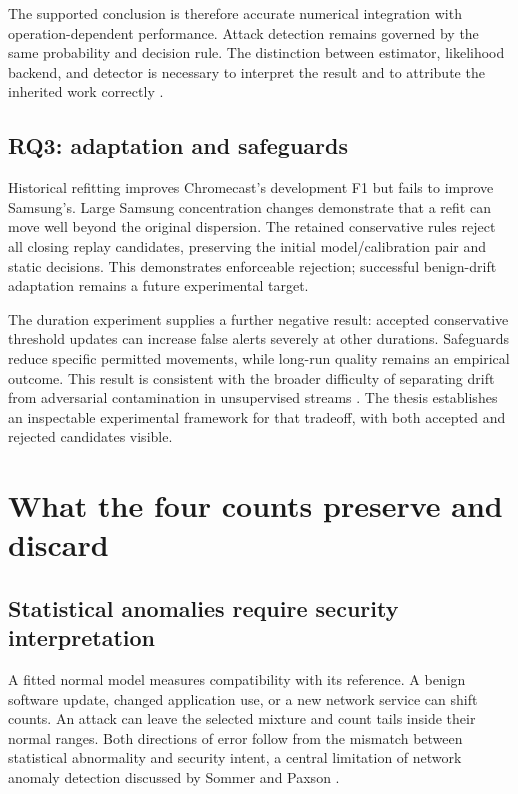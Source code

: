 The supported conclusion is therefore accurate numerical integration
with operation-dependent performance. Attack detection remains governed by
the same probability and decision rule. The distinction between estimator,
likelihood backend, and detector is necessary to interpret the result
and to attribute the inherited work correctly
\cite{minka2000,languasco2023}.

\subsection{RQ3: adaptation and safeguards}

Historical refitting improves Chromecast's development F1 but fails
to improve Samsung's. Large Samsung concentration changes demonstrate
that a refit can move well beyond the original dispersion. The retained
conservative rules reject all closing replay candidates, preserving
the initial model/calibration pair and static decisions. This demonstrates
enforceable rejection; successful benign-drift adaptation remains a future
experimental target.

The duration experiment supplies a further negative result: accepted
conservative threshold updates can increase false alerts severely at
other durations. Safeguards reduce specific permitted movements, while
long-run quality remains an empirical outcome. This result is consistent
with the broader difficulty of separating drift from adversarial
contamination in unsupervised streams \cite{gama2014,kloft2012}.
The thesis establishes an inspectable experimental framework for
that tradeoff, with both accepted and rejected candidates visible.

\section{What the four counts preserve and discard}
\label{sec:representation-limits}

\subsection{Statistical anomalies require security interpretation}

A fitted normal model measures compatibility with its reference. A benign
software update, changed application use, or a new
network service can shift counts. An attack can leave the selected
mixture and count tails inside their normal ranges. Both directions
of error follow from the mismatch between statistical abnormality
and security intent, a central limitation of network anomaly
detection discussed by Sommer and Paxson \cite{sommer2010}.

